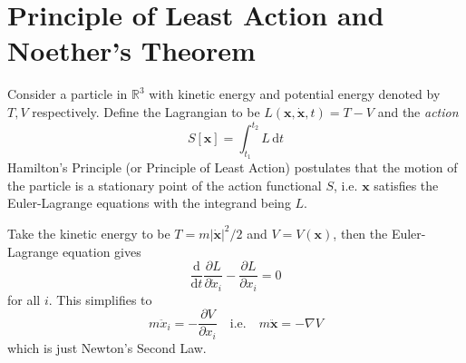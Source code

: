 \documentclass{article}
\begin{document}
\section{Principle of Least Action and Noether's Theorem}
Consider a particle in $\mathbb R^3$ with kinetic energy and potential energy denoted by $T,V$ respectively.
Define the Lagrangian to be $L(\mathbf{x},\mathbf{\dot{x}},t)=T-V$ and the \textit{action}
$$S[\mathbf{x}]=\int_{t_1}^{t_2}L\,\mathrm dt$$
Hamilton's Principle (or Principle of Least Action) postulates that the motion of the particle is a stationary point of the action functional $S$, i.e. $\mathbf{x}$ satisfies the Euler-Lagrange equations with the integrand being $L$.
\begin{example}
    Take the kinetic energy to be $T=m|\mathbf{\dot{x}}|^2/2$ and $V=V(\mathbf{x})$, then the Euler-Lagrange equation gives
    $$\frac{\mathrm d}{\mathrm dt}\frac{\partial L}{\partial \dot{x}_i}-\frac{\partial L}{\partial x_i}=0$$
    for all $i$.
    This simplifies to
    $$m\ddot{x}_i=-\frac{\partial V}{\partial x_i}\quad \text{i.e.}\quad m \ddot{\mathbf{x}}= - \nabla V$$
    which is just Newton's Second Law.
\end{example}
\newpage
\end{document}
